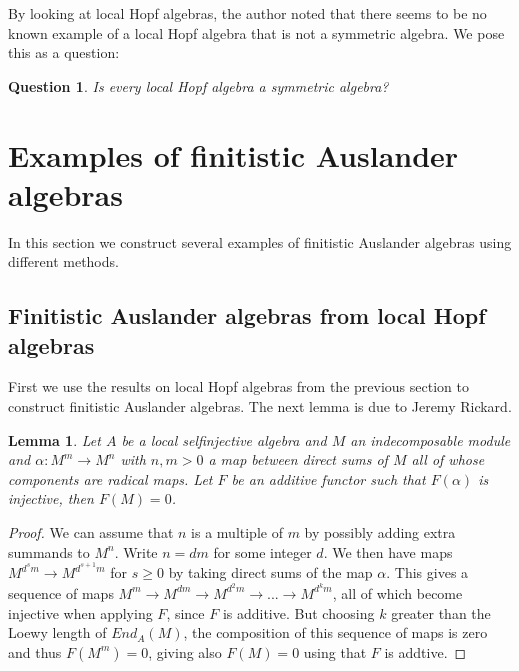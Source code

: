 \documentclass[a4paper]{amsart}
\newtheorem{lemma}[theorem]{Lemma}
\newtheorem{question}[theorem]{Question}
\theoremstyle{definition}
\theoremstyle{remark}
\numberwithin{equation}{theorem}
\begin{document}
By looking at local Hopf algebras, the author noted that there seems to be no known example of a local Hopf algebra that is not a symmetric algebra.
We pose this as a question:
\begin{question}
Is every local Hopf algebra a symmetric algebra?
\end{question}



\section{Examples of finitistic Auslander algebras}
In this section we construct several examples of finitistic Auslander algebras using different methods.
\subsection{Finitistic Auslander algebras from local Hopf algebras}
First we use the results on local Hopf algebras from the previous section to construct finitistic Auslander algebras.
The next lemma is due to Jeremy Rickard.
\begin{lemma}
Let $A$ be a local selfinjective algebra and $M$ an indecomposable module and $\alpha : M^m \rightarrow M^n$ with $n,m >0$ a map between direct sums of $M$ all of whose components are radical maps. Let $F$ be an additive functor such that $F( \alpha)$ is injective, then $F(M)=0$. 
\end{lemma}
\begin{proof}
We can assume that $n$ is a multiple of $m$ by possibly adding extra summands to $M^n$. Write $n=dm$ for some integer $d$. We then have maps $M^{d^s m} \rightarrow M^{d^{s+1} m}$ for $s \geq 0$ by taking direct sums of the map $\alpha$. This gives a sequence of maps $M^m \rightarrow M^{dm} \rightarrow M^{d^2 m} \rightarrow ... \rightarrow M^{d^k m}$, all of which become injective when applying $F$, since $F$ is additive. But choosing $k$ greater than the Loewy length of $End_A(M)$, the composition of this sequence of maps is zero and thus $F(M^m)=0$, giving also $F(M)=0$ using that $F$ is addtive.
\end{proof}
\end{document}
